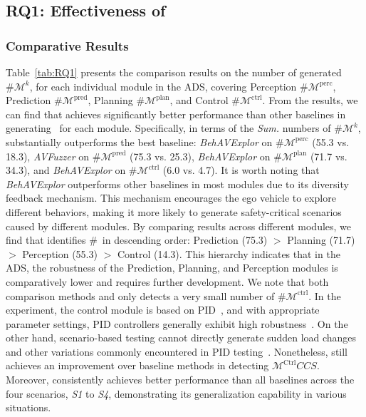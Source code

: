 \subsection{RQ1: Effectiveness of \tool}\label{sec:exp_rq1}

\subsubsection{Comparative Results} 
Table~\ref{tab:RQ1} presents the comparison results on the number of generated \mccs\ $\#\mathcal{M}^{k}$, for each individual module in the ADS, covering Perception $\#\mathcal{M}^{\text{perc}}$, Prediction $\#\mathcal{M}^{\text{pred}}$, Planning $\#\mathcal{M}^{\text{plan}}$, and Control $\#\mathcal{M}^{\text{ctrl}}$. 
From the results, we can find that \tool achieves significantly better performance than other baselines in generating \mccs\ for each module. 
Specifically, in terms of the \textit{Sum.} numbers of $\#\mathcal{M}^{k}$, \tool substantially outperforms the best baseline: \textit{BehAVExplor} on $\#\mathcal{M}^{\text{perc}}$ (55.3 vs. 18.3), \textit{AVFuzzer} on $\#\mathcal{M}^{\text{pred}}$ (75.3 vs. 25.3), \textit{BehAVExplor} on $\#\mathcal{M}^{\text{plan}}$ (71.7 vs. 34.3), and \textit{BehAVExplor} on $\#\mathcal{M}^{\text{ctrl}}$ (6.0 vs. 4.7). 
It is worth noting that \textit{BehAVExplor} outperforms other baselines in most modules due to its diversity feedback mechanism. This mechanism encourages the ego vehicle to explore different behaviors, making it more likely to generate safety-critical scenarios caused by different modules. 
By comparing results across different modules, we find that \tool identifies \#\mccs\ in descending order: Prediction (75.3) $>$ Planning (71.7) $>$ Perception (55.3) $>$ Control (14.3). This hierarchy indicates that in the ADS, the robustness of the Prediction, Planning, and Perception modules is comparatively lower and requires further development. 
We note that both comparison methods and \tool only detects a very small number of $\#\mathcal{M}^{\text{ctrl}}$. 
In the experiment, the control module is based on PID~\cite{johnson2005pid}, and with appropriate parameter settings, PID controllers generally exhibit high robustness~\cite{aastrom1993automatic}. On the other hand, scenario-based testing cannot directly generate sudden load changes and other variations commonly encountered in PID testing~\cite{brannstrom2010model}. Nonetheless, \tool still achieves an improvement over baseline methods in detecting $\mathcal{M}^{\text{Ctrl}}CCS$.
Moreover, \tool consistently achieves better performance than all baselines across the four scenarios, \textit{S1} to \textit{S4}, demonstrating its generalization capability in various situations. 

